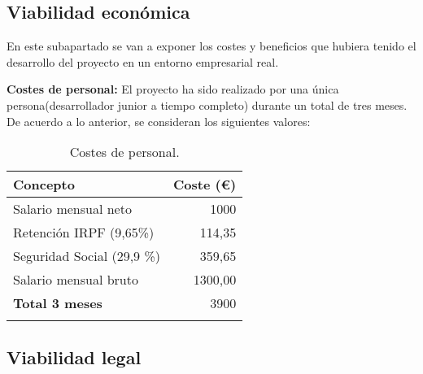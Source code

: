\subsection{Viabilidad económica} 
En este subapartado se van a exponer los costes y beneficios que hubiera tenido el desarrollo del proyecto en un entorno empresarial real. 

\textbf{Costes de personal:}
El proyecto ha sido realizado por una única persona(desarrollador junior a tiempo completo) durante un total de tres meses.
De acuerdo a lo anterior, se consideran los siguientes valores:

\begin{longtable}[]{@{}lr@{}}
\toprule
\begin{minipage}[b]{0.38\columnwidth}\raggedright\strut
\textbf{Concepto}\strut
\end{minipage} & \begin{minipage}[b]{0.20\columnwidth}\raggedleft\strut
\textbf{Coste (\euro{}) }\strut
\end{minipage}\tabularnewline
\midrule
\endhead

\begin{minipage}[t]{0.38\columnwidth}\raggedright\strut
Salario mensual neto\strut
\end{minipage} & \begin{minipage}[t]{0.20\columnwidth}\raggedleft\strut
{1000}\strut
\end{minipage}\tabularnewline

\begin{minipage}[t]{0.38\columnwidth}\raggedright\strut
Retención IRPF (9,65\%)\strut
\end{minipage} & \begin{minipage}[t]{0.20\columnwidth}\raggedleft\strut
114,35\strut
\end{minipage}\tabularnewline

\begin{minipage}[t]{0.38\columnwidth}\raggedright\strut
Seguridad Social (29,9 \%)\strut
\end{minipage} & \begin{minipage}[t]{0.20\columnwidth}\raggedleft\strut
359,65\strut
\end{minipage}\tabularnewline

\begin{minipage}[t]{0.38\columnwidth}\raggedright\strut
Salario mensual bruto\strut
\end{minipage} & \begin{minipage}[t]{0.20\columnwidth}\raggedleft\strut
1300,00\strut
\end{minipage}\tabularnewline

\midrule
\begin{minipage}[t]{0.38\columnwidth}\raggedright\strut
\textbf{Total 3 meses}\strut
\end{minipage} & \begin{minipage}[t]{0.20\columnwidth}\raggedleft\strut
3900\strut
\end{minipage}\tabularnewline
\bottomrule
\caption{Costes de personal.}
\end{longtable}


\subsection{Viabilidad legal}


